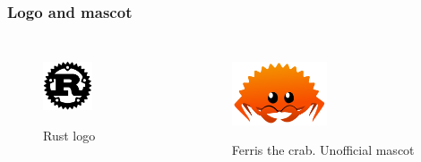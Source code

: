 \documentclass{beamer}
\begin{document}
\begin{frame}

\frametitle{Logo and mascot}

\begin{columns}[c] %


  \begin{figure}
    \centering
    \href{https://foundation.rust-lang.org/img/rust-logo-blk.svg}
      {\includegraphics[width=0.5\textwidth]{rust-logo-blk.png}}
    \caption{Rust logo}
  \end{figure}

  \begin{figure}
    \centering
    \href{https://rustacean.net/assets/rustacean-orig-noshadow.svg}
      {\includegraphics[width=0.5\textwidth]{rustacean-orig-noshadow.png}}
    \caption{Ferris the crab. Unofficial mascot}
  \end{figure}

\end{columns}

\end{frame}
\end{document}
